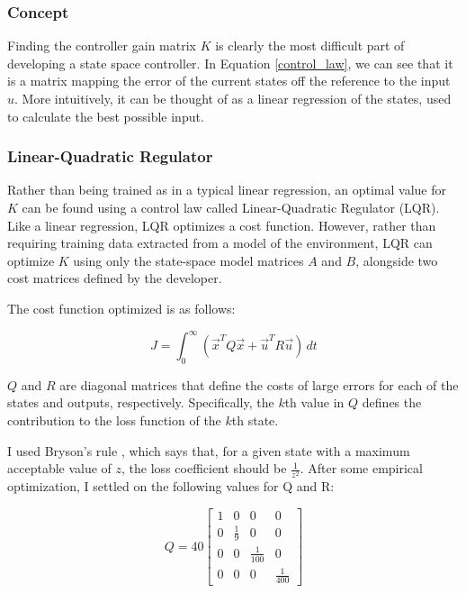 \documentclass[12pt]{article}
\begin{document}
\subsubsection{Concept}

Finding the controller gain matrix $K$ is clearly the most difficult part of developing a state space controller. In Equation \ref{control_law}, we can see that it is a matrix mapping the error of the current states off the reference to the input $u$. More intuitively, it can be thought of as a linear regression of the states, used to calculate the best possible input.

\subsubsection{Linear-Quadratic Regulator}

Rather than being trained as in a typical linear regression, an optimal value for $K$ can be found using a control law called Linear-Quadratic Regulator (LQR). Like a linear regression, LQR optimizes a cost function. However, rather than requiring training data extracted from a model of the environment, LQR can optimize $K$ using only the state-space model matrices $A$ and $B$, alongside two cost matrices defined by the developer.

The cost function optimized is as follows:

\begin{equation}
    J = \int _0 ^{\infty} \! (\vec{x} ^T Q \vec{x} + \vec{u} ^T R \vec{u}) \, dt
\end{equation}

$Q$ and $R$ are diagonal matrices that define the costs of large errors for each of the states and outputs, respectively. Specifically, the $k$th value in $Q$ defines the contribution to the loss function of the $k$th state.

I used Bryson's rule \cite{veness}, which says that, for a given state with a maximum acceptable value of $z$, the loss coefficient should be $\displaystyle \frac{1}{z ^2}$. After some empirical optimization, I settled on the following values for Q and R:

\begin{equation}
    Q = 40 \begin{bmatrix}
        1 & 0 & 0 & 0 \\
        0 & \frac{1}{9} & 0 & 0 \\
        0 & 0 & \frac{1}{100} & 0 \\
        0 & 0 & 0 & \frac{1}{400}
    \end{bmatrix}
\end{equation}
\end{document}
